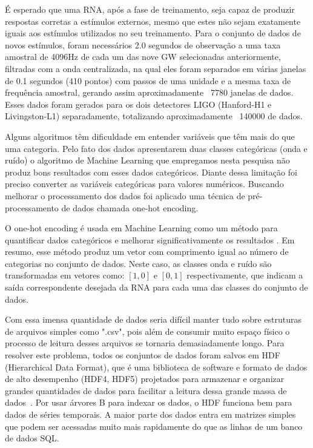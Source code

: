 É esperado que uma RNA, após a fase de treinamento, seja capaz de produzir respostas corretas a estímulos externos, mesmo que estes não sejam exatamente iguais aos estímulos utilizados no seu treinamento. Para o conjunto de dados de novos estímulos, foram necessários 2.0 segundos de observação a uma taxa amostral de 4096Hz de cada um das nove GW selecionadas anteriormente, filtradas com a onda centralizada, na qual eles foram separados em várias janelas de 0.1 segundos (410 pontos) com passos de uma unidade e a mesma taxa de frequência amostral, gerando assim aproximadamente ~7780 janelas de dados. Esses dados foram gerados para os dois detectores LIGO (Hanford-H1 e Livingston-L1) separadamente, totalizando aproximadamente ~140000 de dados.

Alguns algoritmos têm dificuldade em entender variáveis que têm mais do que uma categoria. Pelo fato dos dados apresentarem duas classes categóricas (onda e ruído) o algoritmo de Machine Learning que empregamos nesta pesquisa não produz bons resultados com esses dados categóricos. Diante dessa limitação foi preciso converter as variáveis categóricas para valores numéricos. Buscando melhorar o processamento dos dados foi aplicado uma técnica de pré-processamento de dados chamada one-hot encoding. 

O one-hot encoding é usada em Machine Learning como um método para quantificar dados categóricos e melhorar significativamente os resultados \cite{sarkar2017practical}. Em resumo, esse método produz um vetor com comprimento igual ao número de categorias no conjunto de dados. Neste caso, as classes onda e ruído são transformadas em vetores como: $[1,0]$ e $[0,1]$ respectivamente, que indicam a saída correspondente desejada da RNA para cada uma das classes do conjunto de dados.

Com essa imensa quantidade de dados seria difícil manter tudo sobre estruturas de arquivos simples como ".csv", pois além de consumir muito espaço físico o processo de leitura desses arquivos se tornaria demasiadamente longo. Para resolver este problema, todos os conjuntos de dados foram salvos em HDF (Hierarchical Data Format), que é uma biblioteca de software e formato de dados de alto desempenho (HDF4, HDF5) projetados para armazenar e organizar grandes quantidades de dados para facilitar a leitura dessa grande massa de dados~\cite{hdf}. Por usar árvores B para indexar os dados, o HDF funciona bem para dados de séries temporais. A maior parte dos dados entra em matrizes simples que podem ser acessadas muito mais rapidamente do que as linhas de um banco de dados SQL. 

